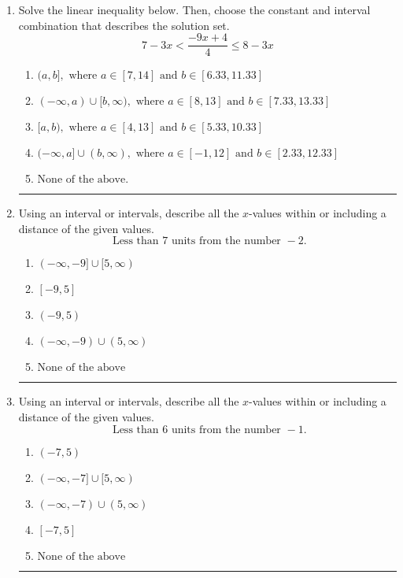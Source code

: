 \documentclass[14pt]{extbook}
\newcommand{\litem}[1]{\item#1\hspace*{-1cm}\rule{\textwidth}{0.4pt}}
\begin{document}
\begin{enumerate}
{\begin{enumerate}[label=\Alph*.]
\end{enumerate} }
\litem{
Solve the linear inequality below. Then, choose the constant and interval combination that describes the solution set.\[ 7 - 3 x < \frac{-9 x + 4}{4} \leq 8 - 3 x \]\begin{enumerate}[label=\Alph*.]
\item \( (a, b], \text{ where } a \in [7, 14] \text{ and } b \in [6.33, 11.33] \)
\item \( (-\infty, a) \cup [b, \infty), \text{ where } a \in [8, 13] \text{ and } b \in [7.33, 13.33] \)
\item \( [a, b), \text{ where } a \in [4, 13] \text{ and } b \in [5.33, 10.33] \)
\item \( (-\infty, a] \cup (b, \infty), \text{ where } a \in [-1, 12] \text{ and } b \in [2.33, 12.33] \)
\item \( \text{None of the above.} \)

\end{enumerate} }
\litem{
Using an interval or intervals, describe all the $x$-values within or including a distance of the given values.\[ \text{ Less than } 7 \text{ units from the number } -2. \]\begin{enumerate}[label=\Alph*.]
\item \( (-\infty, -9] \cup [5, \infty) \)
\item \( [-9, 5] \)
\item \( (-9, 5) \)
\item \( (-\infty, -9) \cup (5, \infty) \)
\item \( \text{None of the above} \)

\end{enumerate} }
\litem{
Using an interval or intervals, describe all the $x$-values within or including a distance of the given values.\[ \text{ Less than } 6 \text{ units from the number } -1. \]\begin{enumerate}[label=\Alph*.]
\item \( (-7, 5) \)
\item \( (-\infty, -7] \cup [5, \infty) \)
\item \( (-\infty, -7) \cup (5, \infty) \)
\item \( [-7, 5] \)
\item \( \text{None of the above} \)


\end{enumerate}}
\end{enumerate}
\end{document}
